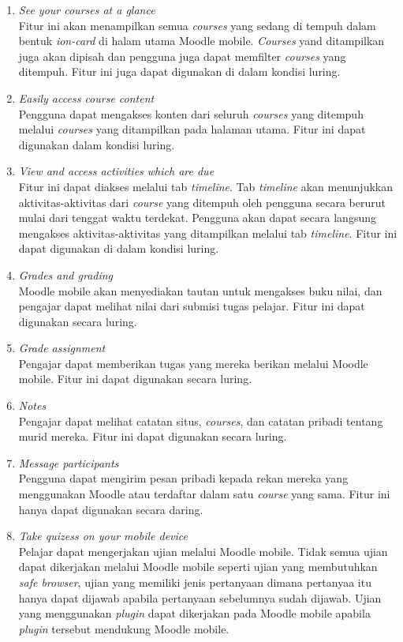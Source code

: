 	\begin{enumerate}
		\item \textit{See your courses at a glance} \\
			Fitur ini akan menampilkan semua \textit{courses} yang sedang di tempuh dalam bentuk \textit{ion-card} di halam utama Moodle mobile. \textit{Courses} yand ditampilkan juga akan dipisah %
			dan pengguna juga dapat memfilter \textit{courses} yang ditempuh. Fitur ini juga dapat digunakan di dalam kondisi luring.
		\item \textit{Easily access course content} \\
			Pengguna dapat mengakses konten dari seluruh \textit{courses} yang ditempuh melalui \textit{courses} yang ditampilkan pada halaman utama. Fitur ini dapat digunakan dalam kondisi luring.
		\item \textit{View and access activities which are due} \\
			Fitur ini dapat diakses melalui tab \textit{timeline}. Tab \textit{timeline} akan menunjukkan aktivitas-aktivitas dari \textit{course} yang ditempuh oleh pengguna secara berurut mulai dari tenggat waktu terdekat. Pengguna akan dapat secara langsung mengakses aktivitas-aktivitas yang ditampilkan melalui tab \textit{timeline}. Fitur ini dapat digunakan di dalam kondisi luring.
		\item \textit{Grades and grading} \\
			Moodle mobile akan menyediakan tautan untuk mengakses buku nilai, dan pengajar dapat melihat nilai dari submisi tugas pelajar. Fitur ini dapat digunakan secara luring.
		\item \textit{Grade assignment} \\
			Pengajar dapat memberikan tugas yang mereka berikan melalui Moodle mobile. Fitur ini dapat digunakan secara luring.
		\item \textit{Notes} \\
			Pengajar dapat melihat catatan situs, \textit{courses}, dan catatan pribadi tentang murid mereka. Fitur ini dapat digunakan secara luring.
		\item \textit{Message participants} \\
			Pengguna dapat mengirim pesan pribadi kepada rekan mereka yang menggunakan Moodle atau terdaftar dalam satu \textit{course} yang sama. Fitur ini hanya dapat digunakan secara daring.
		\item \textit{Take quizess on your mobile device} \\
			Pelajar dapat mengerjakan ujian melalui Moodle mobile. Tidak semua ujian dapat dikerjakan melalui Moodle mobile seperti ujian yang membutuhkan \textit{safe browser}, ujian yang memiliki jenis pertanyaan dimana pertanyaa itu hanya dapat dijawab apabila pertanyaan sebelumnya sudah dijawab. Ujian yang menggunakan \textit{plugin} dapat dikerjakan pada Moodle mobile apabila \textit{plugin} tersebut mendukung Moodle mobile.\cite{Moodlemobile:quiz}
			

\end{enumerate}
